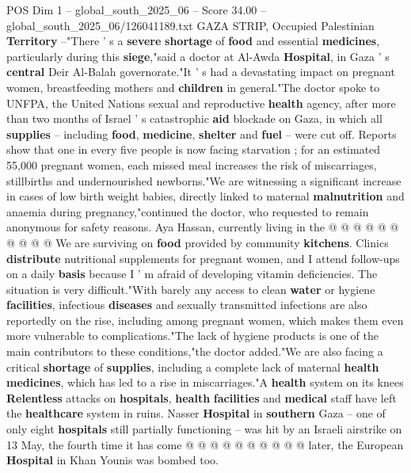 \begin{textsample}{POS Dim 1 – global\_south\_2025\_06 – Score 34.00 – global\_south\_2025\_06/126041189.txt}  \label{ex:f1_pos_135}
GAZA STRIP, Occupied Palestinian \textbf{Territory} --"There ' s a \textbf{severe} \textbf{shortage} of \textbf{food} and essential \textbf{medicines}, particularly during this \textbf{siege},"said a doctor at Al-Awda \textbf{Hospital}, in Gaza ' s \textbf{central} Deir Al-Balah governorate."It ' s had a devastating impact on pregnant women, breastfeeding mothers and \textbf{children} in general."The doctor spoke to UNFPA, the United Nations sexual and reproductive \textbf{health} agency, after more than two months of Israel ' s catastrophic \textbf{aid} blockade on Gaza, in which all \textbf{supplies} -- including \textbf{food}, \textbf{medicine}, \textbf{shelter} and \textbf{fuel} -- were cut off.
Reports show that one in every five people is now facing starvation ; for an estimated 55,000 pregnant women, each missed meal increases the risk of miscarriages, stillbirths and undernourished newborns."We are witnessing a significant increase in cases of low birth weight babies, directly linked to maternal \textbf{malnutrition} and anaemia during pregnancy,"continued the doctor, who requested to remain anonymous for safety reasons.
Aya Hassan, currently living in the @ @ @ @ @ @ @ @ @ @ We are surviving on \textbf{food} provided by community \textbf{kitchens}.
Clinics \textbf{distribute} nutritional supplements for pregnant women, and I attend follow-ups on a daily \textbf{basis} because I ' m afraid of developing vitamin deficiencies.
The situation is very difficult."With barely any access to clean \textbf{water} or hygiene \textbf{facilities}, infectious \textbf{diseases} and sexually transmitted infections are also reportedly on the rise, including among pregnant women, which makes them even more vulnerable to complications."The lack of hygiene products is one of the main contributors to these conditions,"the doctor added."We are also facing a critical \textbf{shortage} of \textbf{supplies}, including a complete lack of maternal \textbf{health} \textbf{medicines}, which has led to a rise in miscarriages."A \textbf{health} system on its knees \textbf{Relentless} attacks on \textbf{hospitals}, \textbf{health} \textbf{facilities} and \textbf{medical} staff have left the \textbf{healthcare} system in ruins.
Nasser \textbf{Hospital} in \textbf{southern} Gaza -- one of only eight \textbf{hospitals} still partially functioning -- was hit by an Israeli airstrike on 13 May, the fourth time it has come @ @ @ @ @ @ @ @ @ @ later, the European \textbf{Hospital} in Khan Younis was bombed too.

\end{textsample}
